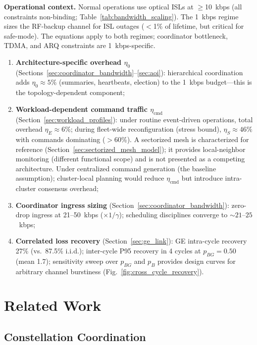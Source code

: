 \documentclass[journal]{IEEEtran}
\begin{document}
\textbf{Operational context.} Normal operations use optical ISLs at $\geq$10~kbps (all constraints non-binding; Table~\ref{tab:bandwidth_scaling}). The 1~kbps regime sizes the RF-backup channel for ISL outages ($<$1\% of lifetime, but critical for safe-mode). The equations apply to both regimes; coordinator bottleneck, TDMA, and ARQ constraints are 1~kbps-specific.
\begin{enumerate}
    \item \textbf{Architecture-specific overhead $\eta_0$} (Sections~\ref{sec:coordinator_bandwidth}--\ref{sec:aoi}): hierarchical coordination adds $\eta_0 \approx 5\%$ (summaries, heartbeats, election) to the 1~kbps budget---this is the topology-dependent component;
    \item \textbf{Workload-dependent command traffic $\eta_{\text{cmd}}$} (Section~\ref{sec:workload_profiles}): under routine event-driven operations, total overhead $\eta_E \approx 6\%$; during fleet-wide reconfiguration (stress bound), $\eta_S \approx 46\%$ with commands dominating ($>$60\%). A sectorized mesh is characterized for reference (Section~\ref{sec:sectorized_mesh_model}); it provides local-neighbor monitoring (different functional scope) and is not presented as a competing architecture. Under centralized command generation (the baseline assumption); cluster-local planning would reduce $\eta_{\text{cmd}}$ but introduce intra-cluster consensus overhead;
    \item \textbf{Coordinator ingress sizing} (Section~\ref{sec:coordinator_bandwidth}): zero-drop ingress at 21--50~kbps ($\times 1/\gamma$); scheduling disciplines converge to ${\sim}21$--$25$~kbps;
    \item \textbf{Correlated loss recovery} (Section~\ref{sec:ge_link}): GE intra-cycle recovery 27\% (vs.\ 87.5\% i.i.d.); inter-cycle P95 recovery in 4 cycles at $p_{BG} = 0.50$ (mean 1.7); sensitivity sweep over $p_{BG}$ and $p_B$ provides design curves for arbitrary channel burstiness (Fig.~\ref{fig:cross_cycle_recovery}).
\end{enumerate}


\section{Related Work}

\subsection{Constellation Coordination}
\end{document}
